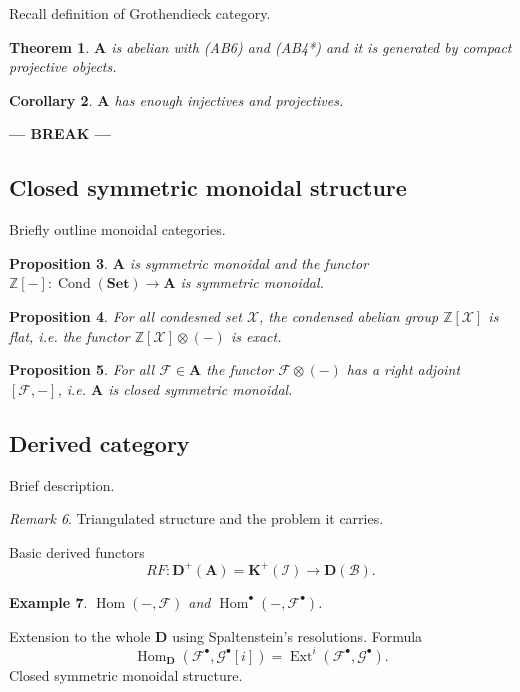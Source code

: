 \documentclass[12pt]{article}
\theoremstyle{darkgreentheorem}
\newtheorem{thm}{Theorem}[section]
\newtheorem{prop}[thm]{Proposition}
\newtheorem{cor}[thm]{Corollary}
\theoremstyle{darkbluedefinition}
\theoremstyle{darkredexample}
\newtheorem{exa}[thm]{Example}
\theoremstyle{remark}
\newtheorem{rem}[thm]{Remark}
\newcommand{\Z}{\mathbb{Z}}
\newcommand{\1}{\mathbbm{1}}
\newcommand{\A}{\mathbf{A}}
\newcommand{\Set}{\mathbf{Set}}
\newcommand{\D}{\mathbf{D}}
\newcommand{\K}{\mathbf{K}}
\newcommand{\F}{\mathcal{F}}
\newcommand{\G}{\mathcal{G}}
\newcommand{\X}{\mathcal{X}}
\DeclareMathOperator{\Hom}{Hom}
\DeclareMathOperator{\Ext}{Ext}
\DeclareMathOperator{\Cond}{Cond}
\newcommand{\ot}{\otimes}
\newcommand{\grd}{^{\bullet}}
\begin{document}
Recall definition of Grothendieck category.

\begin{thm}
    $\A$ is abelian with (AB6) and (AB4*) and it is generated by compact projective objects.
\end{thm}

\begin{cor}
    $\A$ has enough injectives and projectives.
\end{cor}

\begin{center}
    \textbf{--- BREAK ---}
\end{center}

\subsection{Closed symmetric monoidal structure}

Briefly outline monoidal categories.

\begin{prop}
    $\A$ is symmetric monoidal and the functor $\Z[-]\colon \Cond(\Set)\to \A$ is symmetric monoidal.
\end{prop}

\begin{prop}
    For all condesned set $\X$, the condensed abelian group $\Z[\X]$ is flat, i.e. the functor $\Z[\X]\ot (-)$ is exact.
\end{prop}

\begin{prop}
    For all $\F\in\A$ the functor $\F\ot(-)$ has a right adjoint $[\F,-]$, i.e. $\A$ is closed symmetric monoidal.
\end{prop}

\subsection{Derived category}

Brief description.

\begin{rem}
    Triangulated structure and the problem it carries.
\end{rem}

Basic derived functors
\[ RF\colon \D^{+}(\A)=\K^{+}(\mathcal{I})\to \D(\mathscr{B}). \]

\begin{exa}
    $\Hom(-,\F)$ and $\Hom\grd(-,\F\grd)$.
\end{exa}

Extension to the whole $\D$ using Spaltenstein's resolutions.
Formula
\[ \Hom_{\D}(\F\grd,\G\grd[i])=\Ext^{i}(\F\grd,\G\grd).\]
Closed symmetric monoidal structure.
\end{document}
